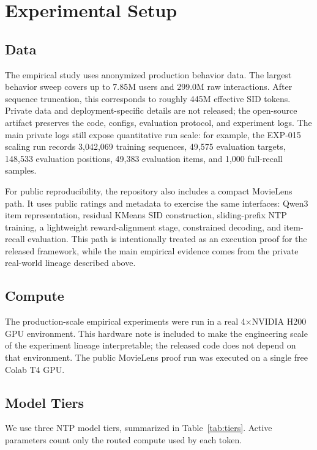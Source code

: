 \documentclass[11pt]{article}
\begin{document}
\section{Experimental Setup}

\subsection{Data}

The empirical study uses anonymized production behavior data. The largest behavior sweep covers up to 7.85M users and 299.0M raw interactions. After sequence truncation, this corresponds to roughly 445M effective SID tokens. Private data and deployment-specific details are not released; the open-source artifact preserves the code, configs, evaluation protocol, and experiment logs. The main private logs still expose quantitative run scale: for example, the EXP-015 scaling run records 3,042,069 training sequences, 49,575 evaluation targets, 148,533 evaluation positions, 49,383 evaluation items, and 1,000 full-recall samples.

For public reproducibility, the repository also includes a compact MovieLens path. It uses public ratings and metadata to exercise the same interfaces: Qwen3 item representation, residual KMeans SID construction, sliding-prefix NTP training, a lightweight reward-alignment stage, constrained decoding, and item-recall evaluation. This path is intentionally treated as an execution proof for the released framework, while the main empirical evidence comes from the private real-world lineage described above.

\subsection{Compute}

The production-scale empirical experiments were run in a real 4$\times$NVIDIA H200 GPU environment. This hardware note is included to make the engineering scale of the experiment lineage interpretable; the released code does not depend on that environment. The public MovieLens proof run was executed on a single free Colab T4 GPU.

\subsection{Model Tiers}

We use three NTP model tiers, summarized in Table~\ref{tab:tiers}. Active parameters count only the routed compute used by each token.
\end{document}
